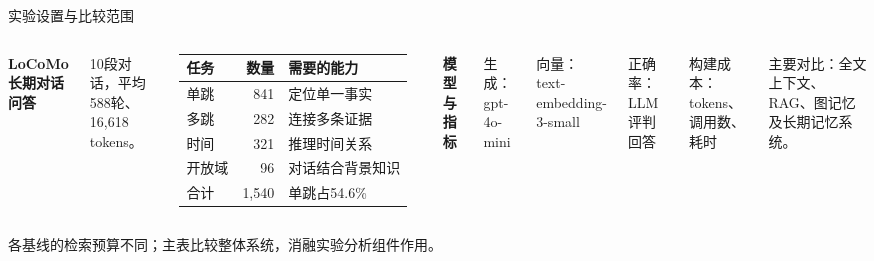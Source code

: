 \begin{frame}{实验设置与比较范围}
\small
\begin{columns}[T,onlytextwidth]
\textbf{LoCoMo 长期对话问答}\par\vspace{2mm}
10段对话，平均588轮、16,618 tokens。\par\vspace{2mm}
\begin{tabularx}{\linewidth}{@{}lrY@{}}
\toprule 任务 & 数量 & 需要的能力\\\midrule
单跳 & 841 & 定位单一事实\\
多跳 & 282 & 连接多条证据\\
时间 & 321 & 推理时间关系\\
开放域 & 96 & 对话结合背景知识\\\midrule
合计 & 1,540 & 单跳占54.6\%\\\bottomrule
\end{tabularx}
\textbf{模型与指标}\par\vspace{2mm}
生成：gpt-4o-mini\par
向量：text-embedding-3-small\par\vspace{3mm}
正确率：LLM评判回答\par
构建成本：tokens、调用数、耗时\par\vspace{3mm}
主要对比：全文上下文、RAG、图记忆及长期记忆系统。
\end{columns}
\vspace{3mm}
各基线的检索预算不同；主表比较整体系统，消融实验分析组件作用。
\end{frame}

